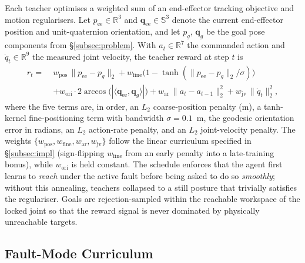\documentclass{article}
\begin{document}
		Each teacher optimises a weighted sum of an end-effector tracking objective and motion
		regularisers. Let $p_\mathrm{ee}\in\mathbb{R}^{3}$ and $\mathbf{q}_\mathrm{ee}\in\mathbb{S}^{3}$
		denote the current end-effector position and unit-quaternion orientation, and let $p_g$,
		$\mathbf{q}_g$ be the goal pose components from \S\ref{subsec:problem}. With
		$a_t\in\mathbb{R}^{7}$ the commanded action and $\dot q_t\in\mathbb{R}^{9}$ the measured
		joint velocity, the teacher reward at step $t$ is
		\begin{equation}
		    \begin{aligned}
		        r_t = \;&w_\mathrm{pos}\,\|p_\mathrm{ee}-p_g\|_2
		            + w_\mathrm{fine}\bigl(1-\tanh(\|p_\mathrm{ee}-p_g\|_2/\sigma)\bigr) \\
		            &+ w_\mathrm{ori}\cdot 2\arccos\!\bigl(|\langle\mathbf{q}_\mathrm{ee},\mathbf{q}_g\rangle|\bigr)
		            + w_\mathrm{ar}\,\|a_t-a_{t-1}\|_2^{2}
		            + w_\mathrm{jv}\,\|\dot q_t\|_2^{2},
		    \end{aligned}
		    \label{eq:reward}
		\end{equation}
		where the five terms are, in order, an $L_2$ coarse-position penalty (m), a tanh-kernel
		fine-positioning term with bandwidth $\sigma=0.1$~m, the geodesic orientation error in
		radians, an $L_2$ action-rate penalty, and an $L_2$ joint-velocity penalty. The weights
		$\{w_\mathrm{pos}, w_\mathrm{fine}, w_\mathrm{ar}, w_\mathrm{jv}\}$ follow the linear
		curriculum specified in \S\ref{subsec:impl} (sign-flipping $w_\mathrm{fine}$ from an early
		penalty into a late-training bonus), while $w_\mathrm{ori}$ is held constant. The schedule
		enforces that the agent first learns to \emph{reach} under the active fault before being
		asked to do so \emph{smoothly}; without this annealing, teachers collapsed to a still
		posture that trivially satisfies the regulariser. Goals are rejection-sampled within the
		reachable workspace of the locked joint so that the reward signal is never dominated by
		physically unreachable targets.

	\subsection{Fault-Mode Curriculum}
	\label{subsec:curriculum}
\end{document}
